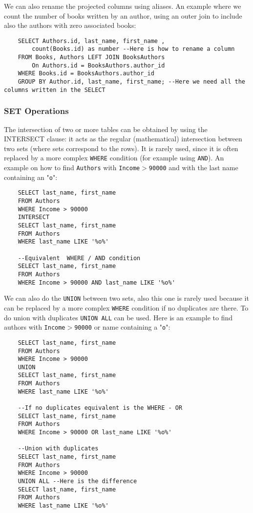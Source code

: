\documentclass[a4page, 11pt]{article}
\theoremstyle{definition}
\begin{document}
We can also rename the projected columns using aliases. An example where we count the number of books written by an author, using an outer join to include also the authors with zero associated books:
\begin{lstlisting}
	SELECT Authors.id, last_name, first_name ,
		count(Books.id) as number --Here is how to rename a column
	FROM Books, Authors LEFT JOIN BooksAuthors
		On Authors.id = BooksAuthors.author_id
	WHERE Books.id = BooksAuthors.author_id
	GROUP BY Author.id, last_name, first_name; --Here we need all the columns written in the SELECT
\end{lstlisting}
\subsubsection{SET Operations}
The intersection of two or more tables can be obtained by using the INTERSECT clause: it acts as the regular (mathematical) intersection between two sets (where sets correspond to the rows). 
It is rarely used, since it is often replaced by a more complex \texttt{WHERE} condition (for example using \texttt{AND}). 
An example on how to find \texttt{Authors} with \texttt{Income$>$90000} and with the last name containing an "\texttt{o}":
\begin{lstlisting}
	SELECT last_name, first_name
	FROM Authors
	WHERE Income > 90000
	INTERSECT 
	SELECT last_name, first_name
	FROM Authors
	WHERE last_name LIKE '%o%' 
	
	--Equivalent  WHERE / AND condition
	SELECT last_name, first_name
	FROM Authors
	WHERE Income > 90000 AND last_name LIKE '%o%'
\end{lstlisting}
We can also do the \texttt{UNION} between two sets, also this one is rarely used because it can be replaced by a more complex \texttt{WHERE} condition if no duplicates are there. To do union with duplicates \texttt{UNION ALL} can be used. 
Here is an example to find authors with \texttt{Income$>$90000} or name containing a "\texttt{o}":
\begin{lstlisting}
	SELECT last_name, first_name
	FROM Authors
	WHERE Income > 90000
	UNION 
	SELECT last_name, first_name
	FROM Authors
	WHERE last_name LIKE '%o%' 
	
	--If no duplicates equivalent is the WHERE - OR
	SELECT last_name, first_name
	FROM Authors
	WHERE Income > 90000 OR last_name LIKE '%o%'
	
	--Union with duplicates
	SELECT last_name, first_name
	FROM Authors
	WHERE Income > 90000
	UNION ALL --Here is the difference
	SELECT last_name, first_name
	FROM Authors
	WHERE last_name LIKE '%o%' 
\end{lstlisting}
\end{document}
